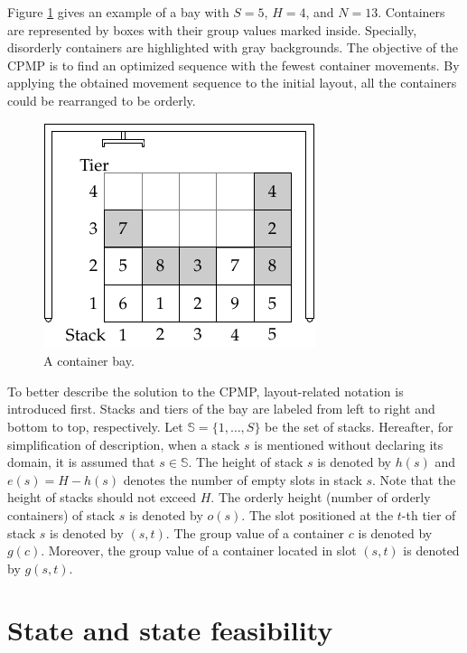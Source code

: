 \documentclass[review,3p,times,12pt,number]{elsarticle}\usepackage{amsmath}\usepackage{amssymb}
\begin{document}
Figure \ref{fig:bay} gives an example of a bay with $S=5$, $H=4$, and $N=13$. Containers are represented by boxes with their group values marked inside.
Specially, disorderly containers are highlighted with gray backgrounds.
The objective of the CPMP is to find an optimized sequence with the fewest container movements. By applying the obtained movement sequence to the initial layout, all the containers could be rearranged to be orderly.

\begin{figure}[htbp]
\centering
\includegraphics{figs/bay.pdf}
\caption{A container bay.}
\label{fig:bay}
\end{figure}


To better describe the solution to the CPMP, layout-related notation is introduced first.
Stacks and tiers of the bay are labeled from left to right and bottom to top, respectively.
Let $\mathbb{S}=\{1,\dots,S\}$ be the set of stacks. Hereafter, for simplification of description, when a stack $s$ is mentioned without declaring its domain, it is assumed that $s\in\mathbb{S}$. The height of stack $s$ is denoted by $h(s)$ and $e(s)=H-h(s)$ denotes the number of empty slots in stack $s$. Note that the height of stacks should not exceed $H$.
The orderly height (number of orderly containers) of stack $s$ is denoted by $o(s)$.
The slot positioned at the $t$-th tier of stack $s$ is denoted by $(s,t)$.
The group value of a container $c$ is denoted by $g(c)$.
Moreover, the group value of a container located in slot $(s,t)$ is denoted by $g(s,t)$.







\section{State and state feasibility}
\label{sec:state}
\end{document}
